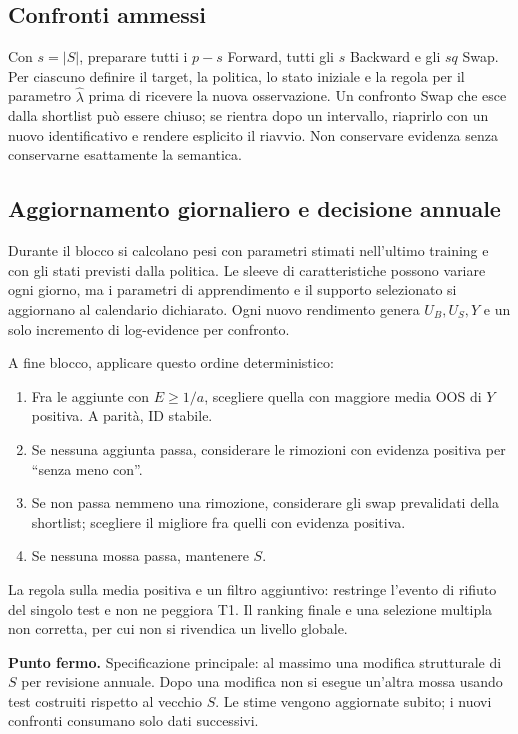 \documentclass[11pt,a4paper]{article}
\theoremstyle{definition}\newtheorem{definition}[theorem]{Definizione}
\theoremstyle{remark}\newtheorem{remark}[theorem]{Osservazione}
\newcommand{\important}[1]{\par\smallskip\noindent\colorbox{light}{\parbox{0.963\linewidth}{\textbf{Punto fermo.} #1}}\par\smallskip}
\begin{document}
\subsection{Confronti ammessi}
Con $s=|S|$, preparare tutti i $p-s$ Forward, tutti gli $s$ Backward e gli $sq$ Swap. Per ciascuno definire il target, la politica, lo stato iniziale e la regola per il parametro $\widehat\lambda$ prima di ricevere la nuova osservazione. Un confronto Swap che esce dalla shortlist può essere chiuso; se rientra dopo un intervallo, riaprirlo con un nuovo identificativo e rendere esplicito il riavvio. Non conservare evidenza senza conservarne esattamente la semantica.

\subsection{Aggiornamento giornaliero e decisione annuale}
Durante il blocco si calcolano pesi con parametri stimati nell'ultimo training e con gli stati previsti dalla politica. Le sleeve di caratteristiche possono variare ogni giorno, ma i parametri di apprendimento e il supporto selezionato si aggiornano al calendario dichiarato. Ogni nuovo rendimento genera $U_B,U_S,Y$ e un solo incremento di log-evidence per confronto.

A fine blocco, applicare questo ordine deterministico:
\begin{enumerate}
\item Fra le aggiunte con $E\ge1/a$, scegliere quella con maggiore media OOS di $Y$ positiva. A parità, ID stabile.
\item Se nessuna aggiunta passa, considerare le rimozioni con evidenza positiva per ``senza meno con''.
\item Se non passa nemmeno una rimozione, considerare gli swap prevalidati della shortlist; scegliere il migliore fra quelli con evidenza positiva.
\item Se nessuna mossa passa, mantenere $S$.
\end{enumerate}
La regola sulla media positiva e un filtro aggiuntivo: restringe l'evento di rifiuto del singolo test e non ne peggiora T1. Il ranking finale e una selezione multipla non corretta, per cui non si rivendica un livello globale.

\important{Specificazione principale: al massimo una modifica strutturale di $S$ per revisione annuale. Dopo una modifica non si esegue un'altra mossa usando test costruiti rispetto al vecchio $S$. Le stime vengono aggiornate subito; i nuovi confronti consumano solo dati successivi.}
\end{document}
